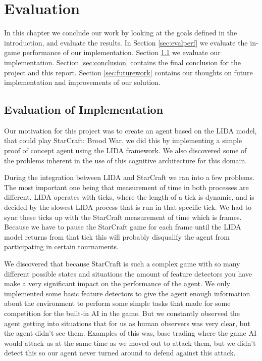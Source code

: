 
\chapter{Evaluation}
In this chapter we conclude our work by looking at the goals defined in the introduction, and evaluate the results.
In Section \ref{sec:evalperf} we evaluate the in-game performance of our implementation.
Section \ref{sec:evalimp} we evaluate our implementation.
Section \ref{sec:conclusion} contains the final conclusion for the project and this report.
Section \ref{sec:futurework} contains our thoughts on future implementation and improvements of our solution.

\section{Evaluation of Implementation}
\label{sec:evalimp}
Our motivation for this project was to create an agent based on the LIDA model, that could play StarCraft: Brood War. we did this by implementing a simple proof of concept agent using the LIDA framework. We also discovered some of the problems inherent in the use of this cognitive architecture for this domain.

During the integration between LIDA and StarCraft we ran into a few problems. The most important one being that measurement of time in both processes are different. LIDA operates with ticks, where the length of a tick is dynamic, and is decided by the slowest LIDA process that is run in that specific tick. We had to sync these ticks up with the StarCraft measurement  of time which is frames. Because we have to pause the StarCraft game for each frame until the LIDA model returns from that tick this will probably disqualify the agent from participating in certain tournaments.

We discovered that because StarCraft is such a complex game with so many different possible states and situations the amount of feature detectors you have make a very significant impact on the performance of the agent. We only implemented some basic feature detectors to give the agent enough information about the environment to perform some simple tasks that made for some competition for the built-in AI in the game. But we constantly observed the agent getting into situations that for us as human observers was very clear, but the agent didn't see them. Examples of this was, base trading where the game AI would attack us at the same time as we moved out to attack them, but we didn't detect this so our agent never turned around to defend against this attack.

